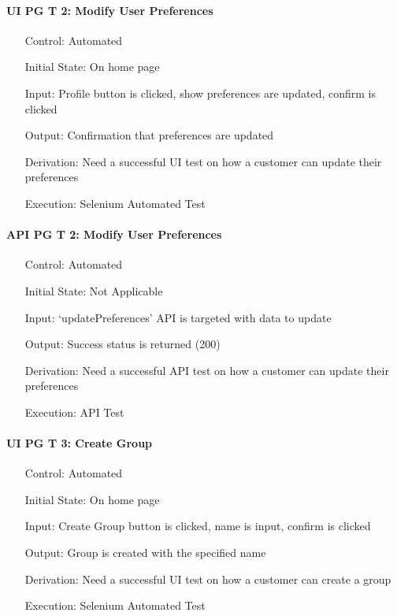\documentclass[12pt, titlepage]{article}
\begin{document}
\paragraph*{UI PG T 2: Modify User Preferences}
\begin{itemize}
	\item[Control:] Automated
	\item[Initial State:] On home page
	\item[Input:] Profile button is clicked, show preferences are updated, confirm is clicked
	\item[Output:] Confirmation that preferences are updated
	\item[Derivation:] Need a successful UI test on how a customer can update their preferences
	\item[Execution:] Selenium Automated Test
\end{itemize}

\paragraph*{API PG T 2: Modify User Preferences}
\begin{itemize}
	\item[Control:] Automated
	\item[Initial State:] Not Applicable
	\item[Input:] `updatePreferences' API is targeted with data to update
	\item[Output:] Success status is returned (200)
	\item[Derivation:] Need a successful API test on how a customer can update their preferences
	\item[Execution:] API Test
\end{itemize}

\paragraph*{UI PG T 3: Create Group}
\begin{itemize}
	\item[Control:] Automated
	\item[Initial State:] On home page
	\item[Input:] Create Group button is clicked, name is input, confirm is clicked
	\item[Output:] Group is created with the specified name
	\item[Derivation:] Need a successful UI test on how a customer can create a group
	\item[Execution:] Selenium Automated Test
\end{itemize}
\end{document}

